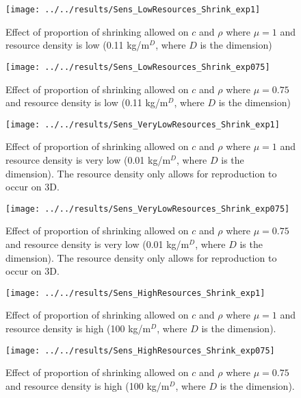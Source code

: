 \begin{figure}[h]
	\centering
	\texttt{[image: ../../results/Sens\_LowResources\_Shrink\_exp1]}
	\caption{Effect of proportion of shrinking allowed on $c$ and $\rho$ where $\mu = 1$ and resource density is low (0.11 kg/m$^D$, where $D$ is the dimension)}
	\label{fig:senslowresourcesshrinkexp1}
\end{figure}
\begin{figure}
	\centering
	\texttt{[image: ../../results/Sens\_LowResources\_Shrink\_exp075]}
	\caption{Effect of proportion of shrinking allowed on $c$ and $\rho$ where $\mu = 0.75$ and resource density is low (0.11 kg/m$^D$, where $D$ is the dimension)}
	\label{fig:senslowresourcesshrinkexp075}
\end{figure}
\begin{figure}
	\centering
	\texttt{[image: ../../results/Sens\_VeryLowResources\_Shrink\_exp1]}
	\caption{Effect of proportion of shrinking allowed on $c$ and $\rho$ where $\mu = 1$ and resource density is very low (0.01 kg/m$^D$, where $D$ is the dimension).  The resource density only allows for reproduction to occur on 3D.}
	\label{fig:sensverylowresourcesshrinkexp1}
\end{figure}
\begin{figure}
	\centering
	\texttt{[image: ../../results/Sens\_VeryLowResources\_Shrink\_exp075]}
	\caption{Effect of proportion of shrinking allowed on $c$ and $\rho$ where $\mu = 0.75$ and resource density is very low (0.01 kg/m$^D$, where $D$ is the dimension).  The resource density only allows for reproduction to occur on 3D.}
	\label{fig:sensverylowresourcesshrinkexp075}
\end{figure}
\begin{figure}
	\centering
	\texttt{[image: ../../results/Sens\_HighResources\_Shrink\_exp1]}
	\caption{Effect of proportion of shrinking allowed on $c$ and $\rho$ where $\mu = 1$ and resource density is high (100 kg/m$^D$, where $D$ is the dimension).}
	\label{fig:senshighresourcesshrinkexp1}
\end{figure}
\begin{figure}
	\centering
	\texttt{[image: ../../results/Sens\_HighResources\_Shrink\_exp075]}
	\caption{Effect of proportion of shrinking allowed on $c$ and $\rho$ where $\mu = 0.75$ and resource density is high (100 kg/m$^D$, where $D$ is the dimension).}
	\label{fig:senshighresourcesshrinkexp075}
\end{figure}
